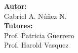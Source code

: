 \begin{titlepage}
	\begin{center}
	\membrete
	\vfill
	\textbf{Autor:}\\
	Gabriel A. N\'{u}\~{n}ez N.\\
	\vfill
	\textbf{Tutores:} \\
	Prof. Patricia Guerrero \\
	Prof. Harold Vasquez
	\vfill
	\fecha
	\end{center}
\end{titlepage}